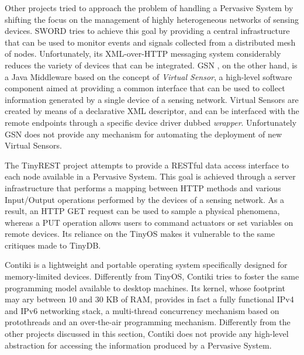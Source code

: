 Other projects tried to approach the problem of handling a Pervasive System by
shifting the focus on the management of highly heterogeneous networks of
sensing devices. SWORD \cite{sword} tries to achieve this goal by providing a
central infrastructure that can be used to monitor events and signals collected
from a distributed mesh of nodes. Unfortunately, its XML-over-HTTP messaging
system considerably reduces the variety of devices that can be integrated. GSN
\cite{aberer2006global}, on the other hand, is a Java Middleware based on the
concept of \textit{Virtual Sensor}, a high-level software component aimed at
providing a common interface that can be used to collect information generated
by a single device of a sensing network. Virtual Sensors are created by means
of a declarative XML descriptor, and can be interfaced with the remote
endpoints through a specific device driver dubbed \textit{wrapper}.
Unfortunately GSN does not provide any mechanism for automating the deployment
of new Virtual Sensors.

The TinyREST \cite{luckenbach2005tinyrest} project attempts to provide a
RESTful \cite{fielding2000architectural} data access interface to each node
available in a Pervasive System. This goal is achieved through a server
infrastructure that performs a mapping between HTTP methods and various
Input/Output operations performed by the devices of a sensing network. As a
result, an HTTP GET request can be used to sample a physical phenomena, whereas
a PUT operation allows users to command actuators or set variables on remote
devices. Its reliance on the TinyOS makes it vulnerable to the same critiques
made to TinyDB.

Contiki \cite{dunkels2004contiki} is a lightweight and portable operating
system specifically designed for memory-limited devices. Differently from
TinyOS, Contiki tries to foster the same programming model available to desktop
machines. Its kernel, whose footprint may ary between 10 and 30 KB of RAM,
provides in fact a fully functional IPv4 and IPv6 networking stack, a
multi-thread concurrency mechanism based on protothreads and an over-the-air
programming mechanism. Differently from the other projects discussed in this
section, Contiki does not provide any high-level abstraction for accessing the
information produced by a Pervasive System.
